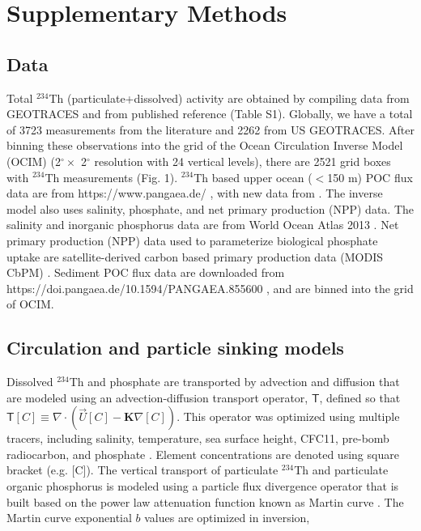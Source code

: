 \section{Supplementary Methods}
\label{sec:meth}

\subsection{Data}
Total $^{234}$Th (particulate+dissolved) activity are obtained by compiling data from GEOTRACES \citep{mawji2015,schlitzer2018} and from published reference (Table S1).
Globally, we have a total of 3723 measurements from the literature and 2262 from US GEOTRACES.
After binning these observations into the grid of the Ocean Circulation Inverse Model (OCIM) (2$^\circ\times$ 2$^\circ$ resolution with 24 vertical levels), there are 2521 grid boxes with $^{234}$Th measurements (Fig. 1).
$^{234}$Th based upper ocean ($<$150 m) POC flux data are from https://www.pangaea.de/ \citep{LeMoigne2013}, with new data from \citet{Black2017}.
The inverse model also uses salinity, phosphate, and net primary production (NPP) data.
The salinity and inorganic phosphorus data are from World Ocean Atlas 2013 \citep{Zweng2013,Garcia2014}.
Net primary production (NPP) data used to parameterize biological phosphate uptake are satellite-derived carbon based primary production data (MODIS CbPM) \citep{Westberry2008}.
Sediment POC flux data are downloaded from https://doi.pangaea.de/10.1594/PANGAEA.855600 \citep{mouw2016}, and are binned into the grid of OCIM.

\subsection{Circulation and particle sinking models}
Dissolved $^{234}$Th and phosphate are transported by advection and diffusion that are modeled using an advection-diffusion transport operator, $\boldsymbol{\mathsf{T}}$, defined so that $\boldsymbol{\mathsf{T}}[C] \equiv \nabla \cdot \left(\vec{U}[C]-\mathbf{K}\nabla [C]\right)$.
This operator was optimized using multiple tracers, including salinity, temperature, sea surface height, CFC11, pre-bomb radiocarbon, and phosphate \citep{DeVries2011,Primeau2013}.
Element concentrations are denoted using square bracket (e.g. [C]).
The vertical transport of particulate $^{234}$Th and particulate organic phosphorus is modeled using a particle flux divergence operator that is built based on the power law attenuation function known as Martin curve \citep{fu2017}.
The Martin curve exponential $b$ values are optimized in inversion,

